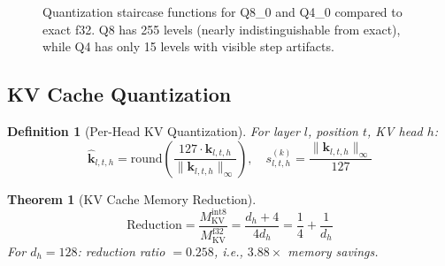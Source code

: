 \documentclass[12pt,a4paper]{article}
\newtheorem{definition}{Definition}[section]
\newtheorem{theorem}{Theorem}[section]
\begin{document}
\begin{figure}[H]
\centering
{}
\caption{Quantization staircase functions for Q8\_0 and Q4\_0 compared to exact f32. Q8 has 255 levels (nearly indistinguishable from exact), while Q4 has only 15 levels with visible step artifacts.}
\label{fig:quantization}
\end{figure}

\subsection{KV Cache Quantization}

\begin{definition}[Per-Head KV Quantization]
For layer $l$, position $t$, KV head $h$:
\begin{equation}
\hat{\bm{k}}_{l,t,h} = \text{round}\left(\frac{127 \cdot \bm{k}_{l,t,h}}{\|\bm{k}_{l,t,h}\|_\infty}\right), \quad s_{l,t,h}^{(k)} = \frac{\|\bm{k}_{l,t,h}\|_\infty}{127}
\label{eq:kv_quant}
\end{equation}
\end{definition}

\begin{theorem}[KV Cache Memory Reduction]
\label{thm:kv_reduction}
\begin{equation}
\text{Reduction} = \frac{M_{\text{KV}}^{\text{int8}}}{M_{\text{KV}}^{\text{f32}}} = \frac{d_h + 4}{4d_h} = \frac{1}{4} + \frac{1}{d_h}
\label{eq:kv_reduction}
\end{equation}
For $d_h = 128$: reduction ratio $= 0.258$, i.e., $\mathbf{3.88\times}$ memory savings.
\end{theorem}
\end{document}
